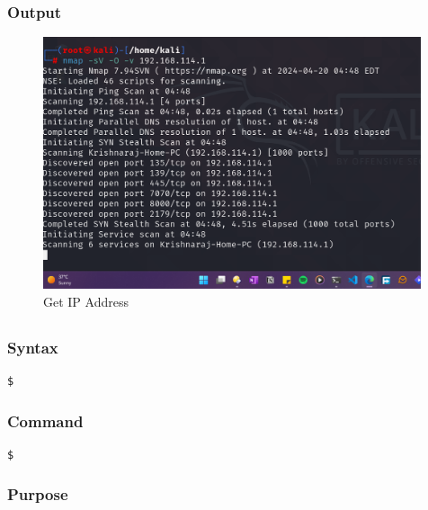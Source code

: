 \documentclass[11pt]{article}
\begin{document}
\subsubsection*{Output}
\begin{figure}[H]
    \centering
    \includegraphics[width=0.99\textwidth]{a3_ss (2).png}
    \caption{Get IP Address}
    \label{fig:1}
\end{figure}
\subsection{}

\subsubsection*{Syntax}
\begin{verbatim}
$
\end{verbatim}

\subsubsection*{Command}
\begin{verbatim}
$
\end{verbatim}

\subsubsection*{Purpose}
\end{document}
